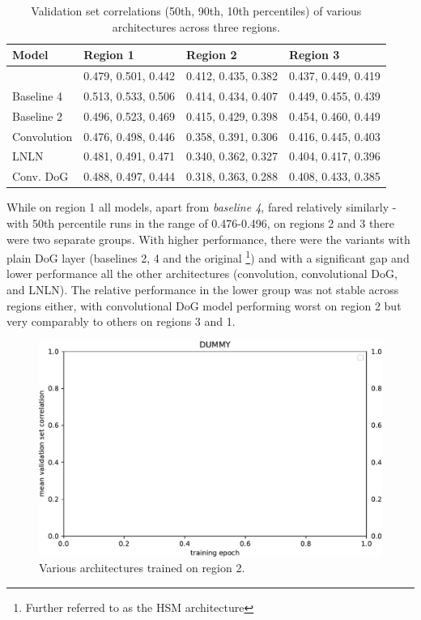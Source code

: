 \begin{table}[H]
    \renewcommand{\arraystretch}{1.0}
    \centering
    \begin{tabular}{l|l|l|l}
        \toprule
        \textbf{Model} & \textbf{Region 1} & \textbf{Region 2} & \textbf{Region 3} \\ \midrule
        \citeauthor{antolik} & 0.479, 0.501, 0.442 & 0.412, 0.435, 0.382 & 0.437, 0.449, 0.419 \\ 
        Baseline 4 & 0.513, 0.533, 0.506 & 0.414, 0.434, 0.407 & 0.449, 0.455, 0.439 \\ 
        Baseline 2 & 0.496, 0.523, 0.469 & 0.415, 0.429, 0.398 & 0.454, 0.460, 0.449 \\ 
        Convolution & 0.476, 0.498, 0.446 & 0.358, 0.391, 0.306 & 0.416, 0.445, 0.403 \\ 
        LNLN & 0.481, 0.491, 0.471 & 0.340, 0.362, 0.327 & 0.404, 0.417, 0.396 \\ 
        Conv. DoG & 0.488, 0.497, 0.444 & 0.318, 0.363, 0.288 & 0.408, 0.433, 0.385 \\ \bottomrule
    \end{tabular}
    \caption[Performance of various models across regions]{Validation set correlations (50th, 90th, 10th percentiles) of various architectures across three regions.}
    \label{tab:5.3.2.1}
    \renewcommand{\arraystretch}{1.0}
\end{table}

While on region 1 all models, apart from \textit{baseline 4}, fared relatively similarly - with 50th percentile runs in the range of 0.476-0.496, on regions 2 and 3 there were two separate groups. With higher performance, there were the variants with plain DoG layer (baselines 2, 4 and the original \cite{antolik}\footnote{Further referred to as the HSM architecture}) and with a significant gap and lower performance all the other architectures (convolution, convolutional DoG, and LNLN). The relative performance in the lower group was not stable across regions either, with convolutional DoG model performing worst on region 2 but very comparably to others on regions 3 and 1. 

\begin{figure}[H]
    \centering
    \includegraphics[width=1\textwidth]{../figures/05_dummy}
    \caption[Various architectures on region 2]{Various architectures trained on region 2.}
    \label{fig:5.3.2.1_2}
\end{figure}

